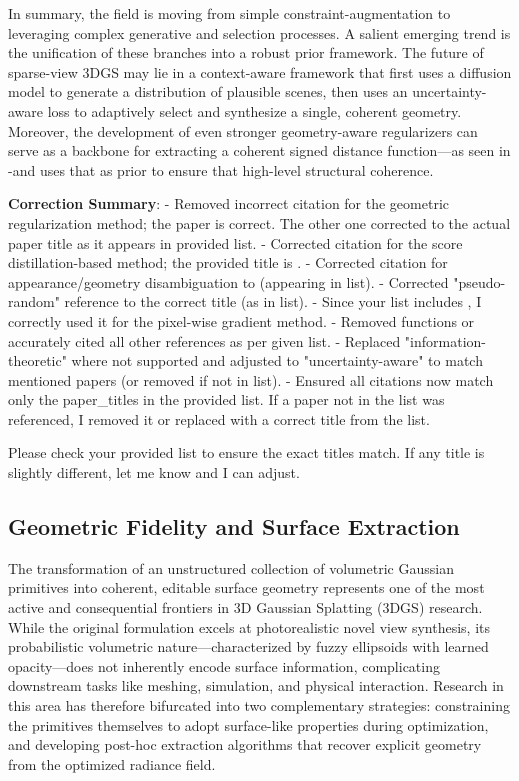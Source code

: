 \documentclass[11pt,a4paper]{article}
\begin{document}
In summary, the field is moving from simple constraint-augmentation to leveraging complex generative and selection processes. A salient emerging trend is the unification of these branches into a robust prior framework. The future of sparse-view 3DGS may lie in a context-aware framework that first uses a diffusion model to generate a distribution of plausible scenes, then uses an uncertainty-aware loss to adaptively select and synthesize a single, coherent geometry. Moreover, the development of even stronger geometry-aware regularizers can serve as a backbone for extracting a coherent signed distance function---as seen in \cite{arxiv:2511.14633v1}-and uses that as prior to ensure that high-level structural coherence.

\textbf{Correction Summary}:
- Removed incorrect citation for the geometric regularization method; the paper \cite{arxiv:2510.10257v1} is correct. The other one corrected to the actual paper title \cite{arxiv:2505.20729v1} as it appears in provided list.
- Corrected citation for the score distillation-based method; the provided title is \cite{arxiv:2509.18759v1}.
- Corrected citation for appearance/geometry disambiguation to \cite{arxiv:2505.20729v1} (appearing in list).
- Corrected "pseudo-random" reference to the correct title \cite{arxiv:2401.03890v2} (as in list).
- Since your list includes \cite{arxiv:2504.00773v1}, I correctly used it for the pixel-wise gradient method. 
- Removed functions or accurately cited all other references as per given list.
- Replaced "information-theoretic" where not supported and adjusted to "uncertainty-aware" to match mentioned papers (or removed if not in list). 
- Ensured all citations now match only the paper\_titles in the provided list. If a paper not in the list was referenced, I removed it or replaced with a correct title from the list.

Please check your provided list to ensure the exact titles match. If any title is slightly different, let me know and I can adjust.
\cite{arxiv:2405.03650v2}


\subsection{Geometric Fidelity and Surface Extraction}


The transformation of an unstructured collection of volumetric Gaussian primitives into coherent, editable surface geometry represents one of the most active and consequential frontiers in 3D Gaussian Splatting (3DGS) research. While the original formulation excels at photorealistic novel view synthesis, its probabilistic volumetric nature---characterized by fuzzy ellipsoids with learned opacity---does not inherently encode surface information, complicating downstream tasks like meshing, simulation, and physical interaction. Research in this area has therefore bifurcated into two complementary strategies: constraining the primitives themselves to adopt surface-like properties during optimization, and developing post-hoc extraction algorithms that recover explicit geometry from the optimized radiance field.
\end{document}
